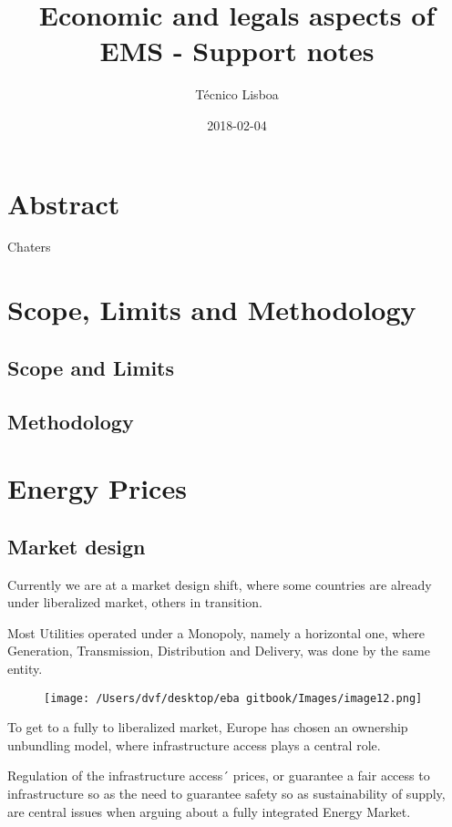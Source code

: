 \documentclass[]{book}
\title{Economic and legals aspects of EMS - Support notes}
\author{Técnico Lisboa}
\date{2018-02-04}
\theoremstyle{definition}
\theoremstyle{definition}
\theoremstyle{definition}
\theoremstyle{remark}
\begin{document}
\maketitle

{
\setcounter{tocdepth}{1}
\tableofcontents
}
\chapter{Abstract}\label{abstract}

Chaters

\chapter{Scope, Limits and Methodology}\label{Scope}

\section{Scope and Limits}\label{scope-and-limits}

\section{Methodology}\label{methodology}

\chapter{Energy Prices}\label{energy-prices}

\section{Market design}\label{market-design}

Currently we are at a market design shift, where some countries are
already under liberalized market, others in transition.

Most Utilities operated under a Monopoly, namely a horizontal one, where
Generation, Transmission, Distribution and Delivery, was done by the
same entity.

\begin{figure}[htbp]
\centering
\texttt{[image: /Users/dvf/desktop/eba gitbook/Images/image12.png]}
\caption{}
\end{figure}

To get to a fully to liberalized market, Europe has chosen an ownership
unbundling model, where infrastructure access plays a central role.

Regulation of the infrastructure access´ prices, or guarantee a fair
access to infrastructure so as the need to guarantee safety so as
sustainability of supply, are central issues when arguing about a fully
integrated Energy Market.
\end{document}
